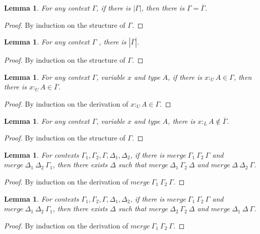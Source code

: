 \documentclass{article}
\newtheorem{lemma}[theorem]{Lemma}
\theoremstyle{definition}
\newcommand{\pure}[1]{|#1|}
\newcommand{\utype}{:_{\scriptscriptstyle U}}
\newcommand{\ltype}{:_{\scriptscriptstyle L}}
\newcommand{\mrg}[3]{merge\ {#1}\ {#2}\ {#3}}
\begin{document}
\begin{lemma}\label{purere}
  For any context $\Gamma$, if there is $\pure{\Gamma}$, then there is $\Gamma = \overline{\Gamma}$.
\end{lemma}
\begin{proof}
  By induction on the structure of $\Gamma$.
\end{proof}

\begin{lemma}\label{repure}
  For any context $\Gamma$ , there is $\pure{\overline{\Gamma}}$.
\end{lemma}
\begin{proof}
  By induction on the structure of $\Gamma$.
\end{proof}

\begin{lemma}\label{hasure}
  For any context $\Gamma$, variable $x$ and type $A$, if there is $x \utype A \in \Gamma$, then there is $x \utype A \in \overline{\Gamma}$.
\end{lemma}
\begin{proof}
  By induction on the derivation of $x \utype A \in \Gamma$.
\end{proof}

\begin{lemma}\label{haslre}
  For any context $\Gamma$, variable $x$ and type $A$, there is $x \ltype A \notin \overline{\Gamma}$.
\end{lemma}
\begin{proof}
  By induction on the structure of $\Gamma$.
\end{proof}

\begin{lemma}\label{mergesplit1}
  For contexts $\Gamma_1, \Gamma_2, \Gamma, \Delta_1, \Delta_2$, if there is $\mrg{\Gamma_1}{\Gamma_2}{\Gamma}$ and $\mrg{\Delta_1}{\Delta_2}{\Gamma_1}$, then there exists $\Delta$ such that $\mrg{\Delta_1}{\Gamma_2}{\Delta}$ and $\mrg{\Delta}{\Delta_2}{\Gamma}$.
\end{lemma}
\begin{proof}
  By induction on the derivation of $\mrg{\Gamma_1}{\Gamma_2}{\Gamma}$.
\end{proof}

\begin{lemma}
  For contexts $\Gamma_1, \Gamma_2, \Gamma, \Delta_1, \Delta_2$, if there is $\mrg{\Gamma_1}{\Gamma_2}{\Gamma}$ and $\mrg{\Delta_1}{\Delta_2}{\Gamma_1}$, then there exists $\Delta$ such that $\mrg{\Delta_2}{\Gamma_2}{\Delta}$ and $\mrg{\Delta_1}{\Delta}{\Gamma}$.
\end{lemma}
\begin{proof}
  By induction on the derivation of $\mrg{\Gamma_1}{\Gamma_2}{\Gamma}$.
\end{proof}
\end{document}
